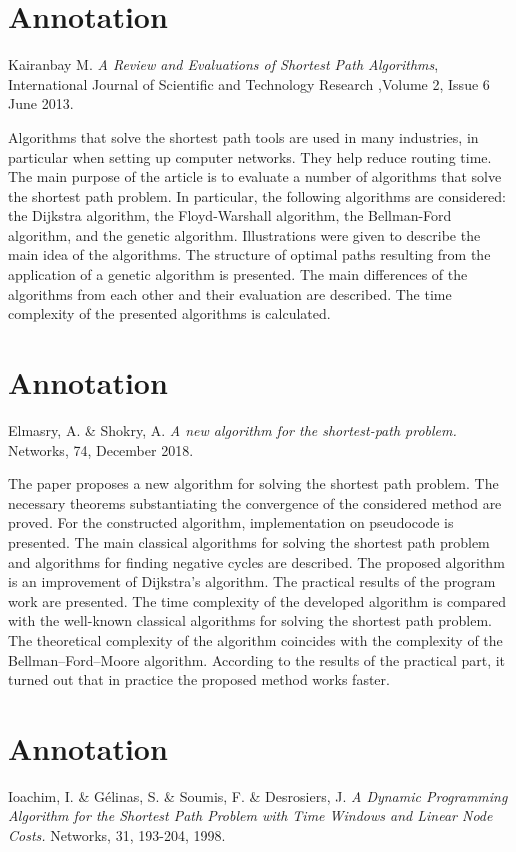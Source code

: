 \documentclass[14pt]{extarticle}
\begin{document}
\section{Annotation}
Kairanbay M. \textit{A  Review and  Evaluations of Shortest  Path Algorithms}, International Journal of Scientific and  Technology Research ,Volume 2, Issue 6 June 2013. 

Algorithms that solve the shortest path tools are used in many industries, in particular when setting up computer networks.
They help reduce routing time.
The main purpose of the article is to evaluate a number of algorithms that solve the shortest path problem.
In particular, the following algorithms are considered: the Dijkstra algorithm, the Floyd-Warshall algorithm, the Bellman-Ford algorithm, and the genetic algorithm.
Illustrations were given to describe the main idea of the algorithms.
The structure of optimal paths resulting from the application of a genetic algorithm is presented.
The main differences of the algorithms from each other and their evaluation are described.
The time complexity of the presented algorithms is calculated.

\section{Annotation}
Elmasry, A. \& Shokry, A. \textit{A new algorithm for the shortest-path problem.} Networks, 74, December 2018. 

The paper proposes a new algorithm for solving the shortest path problem.
The necessary theorems substantiating the convergence of the considered method are proved.
For the constructed algorithm, implementation on pseudocode is presented.
The main classical algorithms for solving the shortest path problem and algorithms for finding negative cycles are described.
The proposed algorithm is an improvement of Dijkstra's algorithm.
The practical results of the program work are presented.
The time complexity of the developed algorithm is compared with the well-known classical algorithms for solving the shortest path problem.
The theoretical complexity of the algorithm coincides with the complexity of the Bellman--Ford--Moore algorithm.
According to the results of the practical part, it turned out that in practice the proposed method works faster.

\section{Annotation}
Ioachim, I. \& Gélinas, S. \& Soumis, F. \& Desrosiers, J. \textit{A Dynamic Programming Algorithm for the Shortest Path Problem with Time Windows and Linear Node Costs.} Networks, 31, 193-204, 1998.
\end{document}
